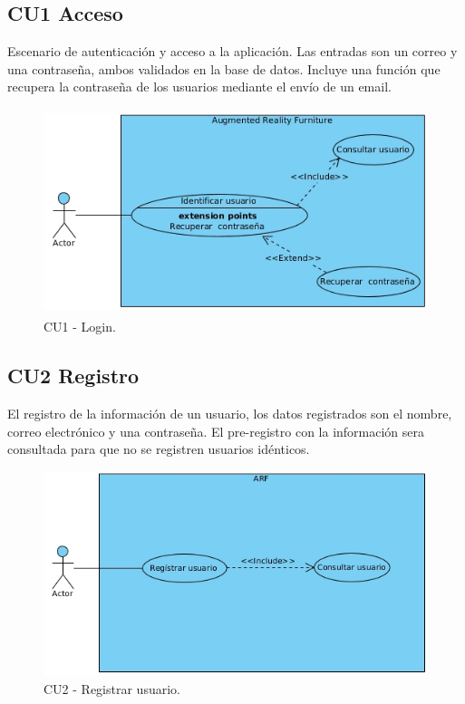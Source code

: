 \subsection{CU1 Acceso}\par
Escenario de autenticación y acceso a la aplicación. Las entradas son un correo y una contraseña, ambos validados en la base de datos. Incluye una función que recupera la contraseña de los usuarios mediante el envío de un email.
\begin{figure}[h!]
	\centering
	\includegraphics[width=12cm,height=6cm]{imagenes/analisis/login.jpg}
	\caption{CU1 - Login.}
	
	\label{fig:analogo}
\end{figure}  
\subsection{CU2 Registro} \par
	El registro de la información de un usuario, los datos registrados son el nombre, correo electrónico y una contraseña. El pre-registro con la información sera consultada para que no se registren usuarios idénticos.
\begin{figure}[h!]
	\centering
	\includegraphics[width=12cm,height=6cm]{imagenes/analisis/registrarUsuario.jpg}
	\caption{CU2 - Registrar usuario.}
	\label{fig:analogo}
\end{figure} 
\newpage
